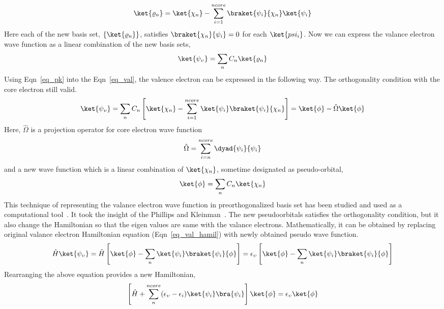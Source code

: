 \begin{equation}
\label{eq_pk}
\ket{\varrho_n} = \ket{\chi_n} - \sum^{ncore}_{i=1} \braket{\psi_i}{\chi_n}\ket{\psi_i}
\end{equation}
Here each of the new basis set, $\{\ket{\varrho_n}\}$, satisfies $\braket{\chi_n}{\psi_i} = 0$ for each $\ket{psi_i}$. Now we can express the valance electron wave function as a linear combination of the new basis sets,
\begin{equation}
\label{eq_val}
\ket{\psi_{\upsilon}} = \sum_n C_n \ket{\varrho_n} 
\end{equation}
Using Eqn~\ref{eq_pk} into the Eqn~\ref{eq_val}, the valence electron can be expressed in the following way. The orthogonality condition with the core electron still valid.
\begin{equation}
\ket{\psi_{\upsilon}} = \sum_n C_n \left [ \ket{\chi_n} - \sum_{i=1}^{ncore} \ket{\psi_i}\braket{\psi_i}{\chi_n} \right ] = \ket{\phi} - \hat{\Omega}\ket{\phi}
\end{equation}
Here, $\hat{\Omega}$ is a projection operator for core electron wave function
\begin{equation}
\label{eq_projection}
\hat{\Omega} = \sum_{i=n}^{ncore} \dyad{\psi_i}{\psi_i}
\end{equation}
and a new wave function which is a linear combination of $\ket{\chi_n}$, sometime designated as pseudo-orbital,
\begin{equation}
\label{eq_pseudoorbital}
\ket{\phi} = \sum_n C_n \ket{\chi_n}
\end{equation}
This technique of representing the valance electron wave function in preorthogonalized basis set has been studied and used as a computational tool~\cite{herring1940new}. It took the insight of the Phillips and Kleinman~\cite{phillips1959new}. The new pseudoorbitals satisfies the orthogonality condition, but it also change the Hamiltonian so that the eigen values are same with the valance electrons. Mathematically, it can be obtained by replacing original valance electron Hamiltonian equation (Eqn~\ref{eq_val_hamil}) with newly obtained pseudo wave function.
\begin{equation}
\label{eq_ps_pot}
\hat{H}\ket{\psi_{\upsilon}} = \hat{H} \left [ \ket{\phi} - \sum_n \ket{\psi_i}\braket{\psi_i}{\phi} \right ] =\epsilon_{\upsilon} \left [ \ket{\phi} - \sum_n \ket{\psi_i}\braket{\psi_i}{\phi}  \right ] 
\end{equation}
Rearranging the above equation provides a new Hamiltonian,
\begin{equation}
\label{eq_ps_hamil}
\left [ \hat{H} + \sum_n ^{ncore} (\epsilon_{\upsilon} - \epsilon_i)\ket{\psi_i}\bra{\psi_i}\right ]\ket{\phi} = 
\epsilon_{\upsilon}\ket{\phi}
\end{equation}
